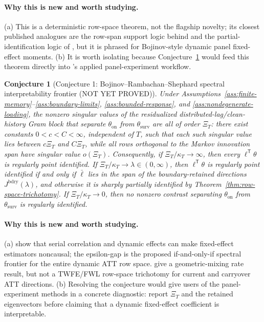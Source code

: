 \documentclass[11pt]{article}
\newcommand{\transpose}{\mathsf{T}}
\theoremstyle{definition}
\theoremstyle{plain}
\newtheorem{conjecture}{Conjecture}
\theoremstyle{remark}
\begin{document}
\paragraph{Why this is new and worth studying.}
(a) This is a deterministic row-space theorem, not the flagship novelty; its closest published analogues are the row-span support logic behind \citet{borusyak2024eventstudy} and the partial-identification logic of \citet{manski2003partial}, but it is phrased for Bojinov-style dynamic panel fixed-effect moments.
(b) It is worth isolating because Conjecture~\ref{conj:brs-frontier} would feed this theorem directly into \citet{bojinov2021panel}'s applied panel-experiment workflow.

\begin{conjecture}[Conjecture 1: Bojinov--Rambachan--Shephard spectral interpretability frontier (NOT YET PROVED)]\label{conj:brs-frontier}
Under Assumptions~\ref{ass:finite-memory}--\ref{ass:boundary-limits}, \ref{ass:bounded-response}, and \ref{ass:nondegenerate-loading}, the nonzero singular values of the residualized distributed-lag/clean-history Gram block that separate \(\theta_{\mathrm{on}}\) from \(\theta_{\mathrm{surv}}\) are all of order \(\Xi_T\):
there exist constants \(0<c<C<\infty\), independent of \(T\), such that each such singular value lies between \(c\Xi_T\) and \(C\Xi_T\), while all rows orthogonal to the Markov innovation span have singular value \(o(\Xi_T)\).
Consequently, if \(\Xi_T/\kappa_T\to\infty\), then every \(\ell^\transpose\theta\) is regularly point identified.
If \(\Xi_T/\kappa_T\to\lambda\in(0,\infty)\), then \(\ell^\transpose\theta\) is regularly point identified if and only if \(\bar\ell\) lies in the span of the boundary-retained directions \(J^{\mathrm{bdry}}(\lambda)\), and otherwise it is sharply partially identified by Theorem~\ref{thm:row-space-trichotomy}.
If \(\Xi_T/\kappa_T\to0\), then no nonzero contrast separating \(\theta_{\mathrm{on}}\) from \(\theta_{\mathrm{surv}}\) is regularly identified.
\end{conjecture}
\paragraph{Why this is new and worth studying.}
(a) \citet{bojinov2021panel} show that serial correlation and dynamic effects can make fixed-effect estimators noncausal; the epsilon-gap is the proposed if-and-only-if spectral frontier for the entire dynamic ATT row space.
\citet{hu2022switchback} give a geometric-mixing rate result, but not a TWFE/FWL row-space trichotomy for current and carryover ATT directions.
(b) Resolving the conjecture would give users of the panel-experiment methods in \citet{bojinov2021panel} a concrete diagnostic: report \(\Xi_T\) and the retained eigenvectors before claiming that a dynamic fixed-effect coefficient is interpretable.
\end{document}
